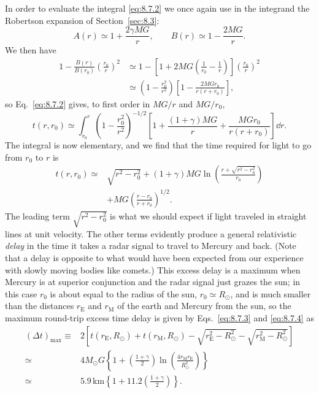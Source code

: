 In order to evaluate the integral \eqref{eq:8.7.2} we once again use in the
integrand the Robertson expansion of Section~\ref{sec:8.3}:
\[
  A(r)\simeq1+\frac{2\gamma MG}{r},
  \qquad
  B(r)\simeq1-\frac{2MG}{r}.
\]
We then have
\[
  \begin{split}
  1-\frac{B(r)}{B(r_0)}\left(\frac{r_0}{r}\right)^2
  &\simeq
  1-\left[
    1+2MG\left(\frac1{r_0}-\frac1r\right)
  \right]\left(\frac{r_0}{r}\right)^2\\
  &\simeq
  \left(1-\frac{r_0^2}{r^2}\right)
  \left[1-\frac{2MGr_0}{r(r+r_0)}\right],
  \end{split}
\]
so Eq.~\eqref{eq:8.7.2} gives, to first order in \(MG/r\) and \(MG/r_0\),
\[
  t(r,r_0)
  \simeq
  \int_{r_0}^{r}
  \left(1-\frac{r_0^2}{r^2}\right)^{-1/2}
  \left[
    1+\frac{(1+\gamma)MG}{r}
    +\frac{MGr_0}{r(r+r_0)}
  \right]\dd r.
\]
The integral is now elementary, and we find that the time required for
light to go from \(r_0\) to \(r\) is
\begin{equation}
  \begin{split}
  t(r,r_0)
  \simeq{}&
  \sqrt{r^2-r_0^2}
  +(1+\gamma)MG
  \ln\left(\frac{r+\sqrt{r^2-r_0^2}}{r_0}\right)\\
  &+MG\left(\frac{r-r_0}{r+r_0}\right)^{1/2}.
  \end{split}
  \tag{8.7.4}\label{eq:8.7.4}
\end{equation}
The leading term \(\sqrt{r^2-r_0^2}\) is what we should expect if light
traveled in straight lines at unit velocity. The other terms evidently
produce a general relativistic \emph{delay} in the time it takes a radar
signal to travel to Mercury and back. (Note that a delay is opposite to
what would have been expected from our experience with slowly moving
bodies like comets.) This excess delay is a maximum when Mercury is at
superior conjunction and the radar signal just grazes the sun; in this
case \(r_0\) is about equal to the radius of the sun, \(r_0\simeq R_\odot\),
and is much smaller than the distances \(r_{\mathrm E}\) and
\(r_{\mathrm M}\) of the earth and Mercury from the sun, so the maximum
round-trip excess time delay is given by Eqs.~\eqref{eq:8.7.3} and
\eqref{eq:8.7.4} as
\begin{equation}
  \begin{split}
  (\Delta t)_{\max}
  \equiv{}&
  2\left[
    t(r_{\mathrm E},R_\odot)+t(r_{\mathrm M},R_\odot)
    -\sqrt{r_{\mathrm E}^2-R_\odot^2}
    -\sqrt{r_{\mathrm M}^2-R_\odot^2}
  \right]\\
  \simeq{}&
  4M_\odot G
  \left\{
    1+\left(\frac{1+\gamma}{2}\right)
    \ln\left(\frac{4r_{\mathrm M}r_{\mathrm E}}{R_\odot^2}\right)
  \right\}\\
  \simeq{}&
  5.9\,\mathrm{km}
  \left\{
    1+11.2\left(\frac{1+\gamma}{2}\right)
  \right\}.
  \end{split}
  \tag{8.7.5}\label{eq:8.7.5}
\end{equation}
